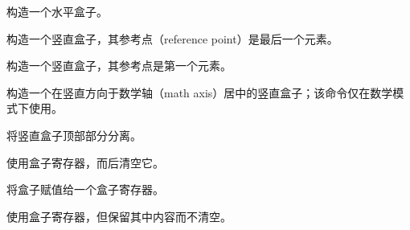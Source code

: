 \documentclass{book}
\begin{document}
\label{cschap:hbox}\label{cschap:vbox}\label{cschap:vtop}\label{cschap:vsplit}\label{cschap:box}\label{cschap:setbox}\label{cschap:copy}\label{cschap:ifhbox}\label{cschap:ifvbox}\label{cschap:ifvoid2}\label{cschap:newbox}\label{cschap:unhbox}\label{cschap:unvbox}\label{cschap:unhcopy}\label{cschap:unvcopy}\label{cschap:ht}\label{cschap:dp}\label{cschap:wd}\label{cschap:boxmaxdepth}\label{cschap:splitmaxdepth}\label{cschap:badness}\label{cschap:hfuzz}\label{cschap:vfuzz}\label{cschap:hbadness}\label{cschap:vbadness}\label{cschap:overfullrule}\label{cschap:hsize}\label{cschap:vsize}\label{cschap:lastbox}\label{cschap:raise}\label{cschap:lower}\label{cschap:moveleft}\label{cschap:moveright}\label{cschap:everyhbox}\label{cschap:everyvbox}
\begin{inventory}
\item [\cs{hbox}] 构造一个水平盒子。
\item [\cs{vbox}] 构造一个竖直盒子，其参考点（reference point）是最后一个元素。
\item [\cs{vtop}] 构造一个竖直盒子，其参考点是第一个元素。
\item [\cs{vcenter}] 构造一个在竖直方向于数学轴（math axis）居中的竖直盒子；该命令仅在数学模式下使用。
\item [\cs{vsplit}] 将竖直盒子顶部部分分离。%
\item [\cs{box}] 使用盒子寄存器，而后清空它。
\item [\cs{setbox}] 将盒子赋值给一个盒子寄存器。
\item [\cs{copy}] 使用盒子寄存器，但保留其中内容而不清空。

\end{inventory}
\end{document}
